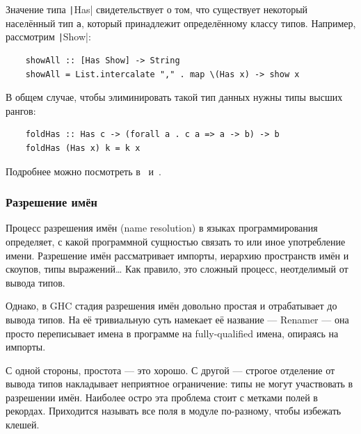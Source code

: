 Значение типа \texttt|Has| свидетельствует о том, что существует некоторый населённый тип \texttt{a}, который принадлежит определённому классу типов.
Например, рассмотрим \texttt|Show|:
\begin{verbatim}
    showAll :: [Has Show] -> String
    showAll = List.intercalate "," . map \(Has x) -> show x
\end{verbatim}

В общем случае, чтобы элиминировать такой тип данных нужны типы высших рангов:
\begin{verbatim}
    foldHas :: Has c -> (forall a . c a => a -> b) -> b
    foldHas (Has x) k = k x
\end{verbatim}

Подробнее можно посмотреть в~\cite[глава 7]{maguire-types} и~\cite[глава 24]{pierce2002types}.

\subsubsection{Разрешение имён} \label{subsubsec:resolve}

Процесс разрешения имён (name resolution) в языках программирования определяет, с какой программной сущностью связать то или иное употребление имени.
Разрешение имён рассматривает импорты, иерархию пространств имён и скоупов, типы выражений\ldots
Как правило, это сложный процесс, неотделимый от вывода типов.

Однако, в GHC стадия разрешения имён довольно простая и отрабатывает до вывода типов.
На её тривиальную суть намекает её название --- Renamer --- она просто переписывает имена в программе на fully-qualified имена, опираясь на импорты.

С одной стороны, простота --- это хорошо.
С другой --- строгое отделение от вывода типов накладывает неприятное ограничение: типы не могут участвовать в разрешении имён.
Наиболее остро эта проблема стоит с метками полей в рекордах.
Приходится называть все поля в модуле по-разному, чтобы избежать клешей.


